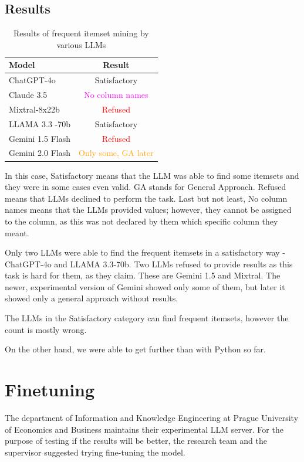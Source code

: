 \documentclass[12pt]{article}
\begin{document}
\subsection{Results}

\begin{table}[h]
    \centering
    \begin{tabular}{|l|c|}
        \hline
        Model & Result \\
        \hline
        ChatGPT-4o & Satisfactory \\
        \hline
        Claude 3.5 & \textcolor{magenta}{No column names} \\
        \hline
        Mixtral-8x22b & \textcolor{red}{Refused} \\
        \hline
        LLAMA 3.3 -70b & Satisfactory \\
        \hline
        Gemini 1.5 Flash & \textcolor{red}{Refused} \\
        \hline
        Gemini 2.0 Flash & \textcolor{orange}{Only some, GA later} \\
        \hline
    \end{tabular}
    \caption{Results of frequent itemset mining by various LLMs}
    \label{tab:my_label}
\end{table}

In this case, Satisfactory means that the LLM was able to find some itemsets and they were in some cases even valid. GA stands for General Approach. Refused means that LLMs declined to perform the task. Last but not least, No column names means that the LLMs provided values; however, they cannot be assigned to the column, as this was not declared by them which specific column they meant.

Only two LLMs were able to find the frequent itemsets in a satisfactory way - ChatGPT-4o and LLAMA 3.3-70b.
Two LLMs refused to provide results as this task is hard for them, as they claim. These are Gemini 1.5 and Mixtral.
The newer, experimental version of Gemini showed only some of them, but later it showed only a general approach without results.

The LLMs in the Satisfactory category can find frequent itemsets, however the count is mostly wrong.

On the other hand, we were able to get further than with Python so far.

\section{Finetuning}
The department of Information and Knowledge Engineering at Prague University of Economics and Business maintains their experimental LLM server. For the purpose of testing if the results will be better, the research team and the supervisor suggested trying fine-tuning the model.
\end{document}
